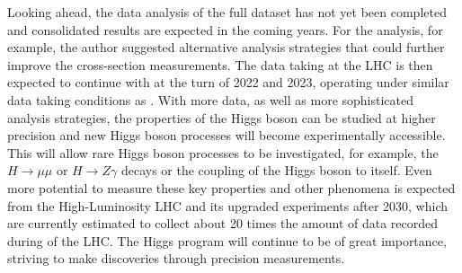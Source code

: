 Looking ahead, the data analysis of the full \RunTwo dataset has not yet been completed and consolidated results are expected in the coming years. For the \HWW analysis, for example, the author suggested alternative analysis strategies that could further improve the \HWW cross-section measurements. 
The data taking at the LHC is then expected to continue with \RunThr at the turn of 2022 and 2023, operating under similar data taking conditions as \RunTwo. 
With more data, as well as more sophisticated analysis strategies, the properties of the Higgs boson can be studied at higher precision and new Higgs boson processes will become experimentally accessible. 
This will allow rare Higgs boson processes to be investigated, for example, the $H \to \mu\mu$ or $H \to Z\gamma$ decays or the coupling of the Higgs boson to itself.
Even more potential to measure these key properties and other phenomena is expected from the High-Luminosity LHC and its upgraded experiments after 2030, which are currently estimated to collect about 20 times the amount of data recorded during \RunTwo of the LHC. 
The Higgs program will continue to be of great importance, striving to make discoveries through precision measurements. 

